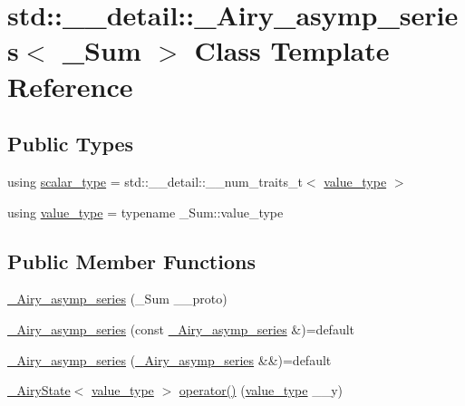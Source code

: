 \hypertarget{classstd_1_1____detail_1_1__Airy__asymp__series}{}\section{std\+:\+:\+\_\+\+\_\+detail\+:\+:\+\_\+\+Airy\+\_\+asymp\+\_\+series$<$ \+\_\+\+Sum $>$ Class Template Reference}
\label{classstd_1_1____detail_1_1__Airy__asymp__series}
\subsection*{Public Types}
\begin{DoxyCompactItemize}
\item 
using \hyperlink{classstd_1_1____detail_1_1__Airy__asymp__series_a17ec74b13ebc38d5531bf27cd31684fb}{scalar\+\_\+type} = std\+::\+\_\+\+\_\+detail\+::\+\_\+\+\_\+num\+\_\+traits\+\_\+t$<$ \hyperlink{classstd_1_1____detail_1_1__Airy__asymp__series_a729a698f23629a2f94b6ef71f377efc5}{value\+\_\+type} $>$
\item 
using \hyperlink{classstd_1_1____detail_1_1__Airy__asymp__series_a729a698f23629a2f94b6ef71f377efc5}{value\+\_\+type} = typename \+\_\+\+Sum\+::value\+\_\+type
\end{DoxyCompactItemize}
\subsection*{Public Member Functions}
\begin{DoxyCompactItemize}
\item 
\hyperlink{classstd_1_1____detail_1_1__Airy__asymp__series_a2768b3e101876b969b606cbde8b2e133}{\+\_\+\+Airy\+\_\+asymp\+\_\+series} (\+\_\+\+Sum \+\_\+\+\_\+proto)
\item 
\hyperlink{classstd_1_1____detail_1_1__Airy__asymp__series_a48eab98c05f50ad5b5f00f1ad9628e14}{\+\_\+\+Airy\+\_\+asymp\+\_\+series} (const \hyperlink{classstd_1_1____detail_1_1__Airy__asymp__series}{\+\_\+\+Airy\+\_\+asymp\+\_\+series} \&)=default
\item 
\hyperlink{classstd_1_1____detail_1_1__Airy__asymp__series_a967f89ea4dfc21c982fdc61315ea720d}{\+\_\+\+Airy\+\_\+asymp\+\_\+series} (\hyperlink{classstd_1_1____detail_1_1__Airy__asymp__series}{\+\_\+\+Airy\+\_\+asymp\+\_\+series} \&\&)=default
\item 
\hyperlink{structstd_1_1____detail_1_1__AiryState}{\+\_\+\+Airy\+State}$<$ \hyperlink{classstd_1_1____detail_1_1__Airy__asymp__series_a729a698f23629a2f94b6ef71f377efc5}{value\+\_\+type} $>$ \hyperlink{classstd_1_1____detail_1_1__Airy__asymp__series_acd5ce4d332334a4f669a981d588b417c}{operator()} (\hyperlink{classstd_1_1____detail_1_1__Airy__asymp__series_a729a698f23629a2f94b6ef71f377efc5}{value\+\_\+type} \+\_\+\+\_\+y)
\end{DoxyCompactItemize}
